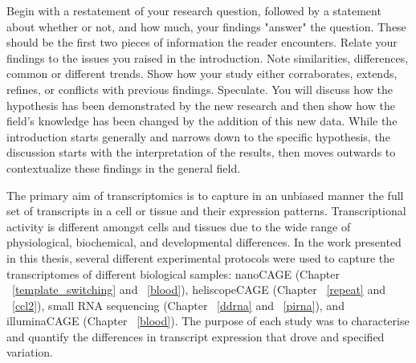 Begin with a restatement of your research question, followed by a statement about whether or not, and how much, your findings "answer" the question. These should be the first two pieces of information the reader encounters. Relate your findings to the issues you raised in the introduction. Note similarities, differences, common or different trends.  Show how your study either corraborates, extends, refines, or conflicts with previous findings. Speculate. You will discuss how the hypothesis has been demonstrated by the new research and then show how the field's knowledge has been changed by the addition of this new data. While the introduction starts generally and narrows down to the specific hypothesis, the discussion starts with the interpretation of the results, then moves outwards to contextualize these findings in the general field.

The primary aim of transcriptomics is to capture in an unbiased manner the full set of transcripts in a cell or tissue and their expression patterns\cite{pmid19015660}. Transcriptional activity is different amongst cells and tissues due to the wide range of physiological, biochemical, and developmental differences. In the work presented in this thesis, several different experimental protocols were used to capture the transcriptomes of different biological samples: nanoCAGE\cite{pmid20543846} (Chapter ~\ref{template_switching} and ~\ref{blood}), heliscopeCAGE\cite{pmid21596820} (Chapter ~\ref{repeat} and ~\ref{ccl2}), small RNA sequencing\cite{pmid20964636} (Chapter ~\ref{ddrna} and ~\ref{pirna}), and illuminaCAGE\cite{Takahashi2012} (Chapter ~\ref{blood}). The purpose of each study was to characterise and quantify the differences in transcript expression that drove and specified variation.

